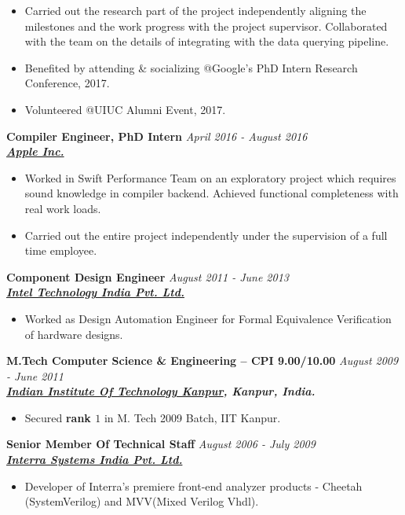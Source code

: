 \documentclass[9pt]{article}
\newenvironment{changemargin}[2]{%
  \begin{list}{}{%
    \setlength{\topsep}{0pt}%
    \setlength{\leftmargin}{#1}%
    \setlength{\rightmargin}{#2}%
    \setlength{\listparindent}{\parindent}%
    \setlength{\itemindent}{\parindent}%
    \setlength{\parsep}{\parskip}%
  }%
  \item[]}{\end{list}
}
\newenvironment{body} {
	\vspace*{-16pt}
	\begin{changemargin}{-0.25in}{-0.5in}
  }	
	{\end{changemargin}
}
\begin{document}
\begin{body}
\begin{itemize}
		\item Carried out the research part of the project
			independently aligning the milestones and the work
			progress with the project supervisor. Collaborated with
			the team on the details of integrating with the data
			querying pipeline.
		\item Benefited by attending \& socializing @Google's PhD Intern Research Conference, 2017.
		\item Volunteered @UIUC Alumni Event, 2017.
	\end{itemize}


 \medskip
        \textbf{Compiler Engineer, PhD Intern} \hfill \emph{April 2016 - August 2016}\\
	\textbf{\emph{\href{http://www.apple.com}{Apple Inc.}}}
	\begin{itemize} \itemsep -0pt
                \item  Worked in Swift Performance Team on an
                  exploratory project which requires sound knowledge in
                  compiler backend. Achieved functional completeness with real
                  work loads.
		\item Carried out the entire project independently under the
			supervision of a full time employee.
	\end{itemize}

 \medskip
        \textbf{Component Design Engineer} \hfill \emph{August 2011 - June 2013}\\
	\textbf{\emph{\href{http://www.intel.in/content/www/in/en/homepage.html}{Intel Technology India Pvt. Ltd.}}}
	\begin{itemize} \itemsep -0pt
                \item Worked as Design Automation Engineer for Formal Equivalence Verification of hardware designs.
	\end{itemize}

 \medskip
	\textbf{M.Tech Computer Science \& Engineering -- CPI 9.00/10.00}{} \hfill \emph{August 2009 - June 2011}{} \\
	\textbf{\emph{\href{http://www.iitk.ac.in/}{Indian Institute Of Technology Kanpur}, Kanpur, India.}{}} \\
	\begin{itemize} \itemsep -0pt
		\item Secured \textbf{rank $1$} in M. Tech 2009 Batch, IIT Kanpur.
	\end{itemize}

 \medskip
        \textbf{Senior Member Of Technical Staff} \hfill \emph{August 2006 - July 2009}\\
       	\textbf{\emph{\href{http://www.interrasystems.com/}{Interra Systems India Pvt. Ltd.}}}
	\begin{itemize} \itemsep -0pt
		\item Developer of Interra's premiere front-end analyzer products - Cheetah (SystemVerilog) and MVV(Mixed Verilog Vhdl).
	\end{itemize}


\end{body}
\end{document}
